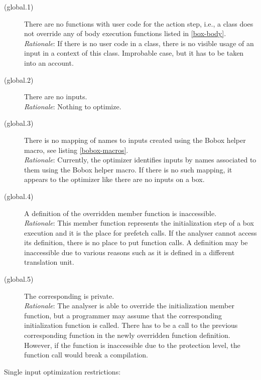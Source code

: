 \begin{description}
\item[(global.1)]{There are no functions with user code for the action step, i.e., a class does not override any of body execution functions listed in \ref{box-body}.\\
\emph{Rationale}: If there is no user code in a class, there is no visible usage of an input in a context of this class. Improbable case, but it has to be taken into an account.
}

\item[(global.2)]{There are no inputs.\\
\emph{Rationale}: Nothing to optimize. 
}

\item[(global.3)]{There is no mapping of names to inputs created using the Bobox helper macro, see listing \ref{bobox-macros}.\\
\emph{Rationale}: Currently, the optimizer identifies inputs by names associated to them using the Bobox helper macro. If there is no such mapping, it appears to the optimizer like there are no inputs on a box.
}

\item[(global.4)]{A definition of the overridden  member function is inaccessible.\\
\emph{Rationale}: This member function represents the initialization step of a box execution and it is the place for prefetch calls. If the analyser cannot access its definition, there is no place to put function calls. A definition may be inaccessible due to various reasons such as it is defined in a different translation unit.
}

\item[(global.5)]{The corresponding  is private.\\
\emph{Rationale}: The analyser is able to override the initialization member function, but a programmer may assume that the corresponding initialization function is called. There has to be a call to the previous corresponding function in the newly overridden function definition. However, if the function is inaccessible due to the protection level, the function call would break a compilation.
}
\end{description}

Single input optimization restrictions:


